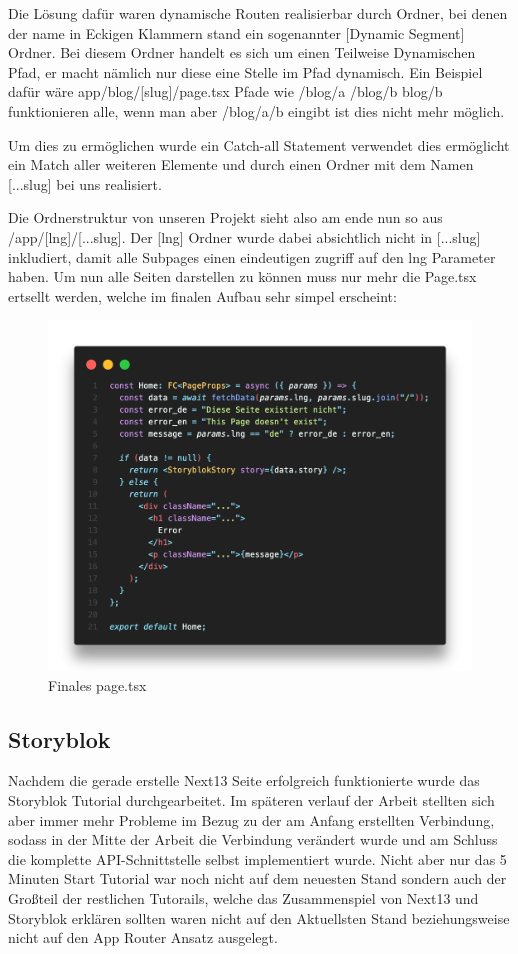 Die Lösung dafür waren dynamische Routen realisierbar durch Ordner, bei denen der name in Eckigen Klammern stand ein sogenannter [Dynamic Segment] Ordner. Bei diesem Ordner handelt es sich um einen Teilweise Dynamischen Pfad, er macht nämlich nur diese eine Stelle im Pfad dynamisch. Ein Beispiel dafür wäre app/blog/[slug]/page.tsx Pfade wie /blog/a /blog/b blog/b funktionieren alle, wenn man aber /blog/a/b eingibt ist dies nicht mehr möglich. 

Um dies zu ermöglichen wurde ein Catch-all Statement verwendet dies ermöglicht ein Match aller weiteren Elemente und durch einen Ordner mit dem Namen [...slug] bei uns realisiert.

Die Ordnerstruktur von unseren Projekt sieht also am ende nun so aus /app/[lng]/[...slug]. Der [lng] Ordner wurde dabei absichtlich nicht in [...slug] inkludiert, damit alle Subpages einen eindeutigen zugriff auf den lng Parameter haben. Um nun alle Seiten darstellen zu können muss nur mehr die Page.tsx ertsellt werden, welche im finalen Aufbau sehr simpel erscheint:

\begin{figure}[h]
    \centering
    \includegraphics[width=\linewidth]{pics/final-page.png}
    \caption{Finales page.tsx}
\end{figure}

\subsection{Storyblok}
Nachdem die gerade erstelle Next13 Seite erfolgreich funktionierte wurde das Storyblok Tutorial durchgearbeitet. Im späteren verlauf der Arbeit stellten sich aber immer mehr Probleme im Bezug zu der am Anfang erstellten Verbindung, sodass in der Mitte der Arbeit die Verbindung verändert wurde und am Schluss die komplette API-Schnittstelle selbst implementiert wurde.
Nicht aber nur das 5 Minuten Start Tutorial war noch nicht auf dem neuesten Stand sondern auch der Großteil der restlichen Tutorails, welche das Zusammenspiel von Next13 und Storyblok erklären sollten waren nicht auf den Aktuellsten Stand beziehungsweise nicht auf den App Router Ansatz ausgelegt.

